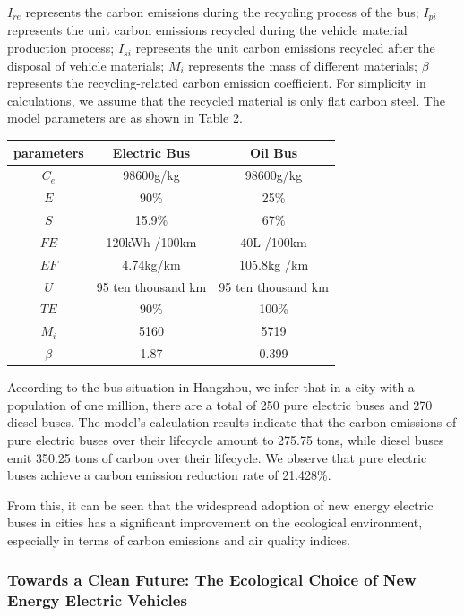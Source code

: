 \documentclass{apmcmthesis}
\begin{document}
$I_{re}$ represents the carbon emissions during the recycling process of the bus; $I_{pi}$ represents the unit carbon emissions recycled during the vehicle material production process; $I_{si}$ represents the unit carbon emissions recycled after the disposal of vehicle materials; $M_i$ represents the mass of different materials; $\beta$ represents the recycling-related carbon emission coefficient.
For simplicity in calculations, we assume that the recycled material is only flat carbon steel.
The model parameters are as shown in Table 2.
\begin{longtable}{c|c|c}
    \hline
    parameters      &  Electric Bus  & Oil Bus  \\ \hline
    $C_e$           &  98600g/kg          &  98600g/kg        \\
    $E$             &    90\%            &  25\%        \\
    $S$             &    15.9\%            &    67\%       \\
    $FE$            &    120kWh /100km  &  40L /100km           \\
    $EF$            &    4.74kg/km            &105.8kg /km          \\
    $U$             &     95 ten thousand km      &  95 ten thousand km         \\
    $TE$            &     90\%           &  100\%          \\
    $M_i$           &      5160          &   5719         \\
    $\beta$         &      1.87          &   0.399         \\ \hline

\end{longtable}
According to the bus situation in Hangzhou, we infer that in a city with a population of one million, there are a total of 250 pure electric buses and 270 diesel buses. The model's calculation results indicate that the carbon emissions of pure electric buses over their lifecycle amount to 275.75 tons, while diesel buses emit 350.25 tons of carbon over their lifecycle. We observe that pure electric buses achieve a carbon emission reduction rate of 21.428\%.

From this, it can be seen that the widespread adoption of new energy electric buses in cities has a significant improvement on the ecological environment, especially in terms of carbon emissions and air quality indices.

\subsubsection{Towards a Clean Future: The Ecological Choice of New Energy Electric Vehicles}
\end{document}
